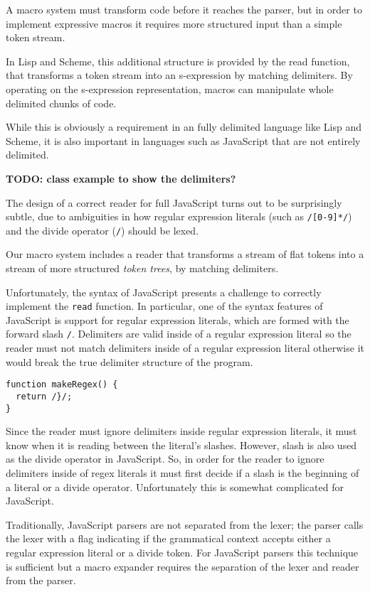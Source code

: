 \documentclass[preprint,10pt]{sigplanconf}
\begin{document}
A macro system must transform code before it reaches the parser, but
in order to implement expressive macros it requires more structured
input than a simple token stream.

In Lisp and Scheme, this additional structure is provided by the read
function, that transforms a token stream into an s-expression by
matching delimiters. By operating on the s-expression representation,
macros can manipulate whole delimited chunks of code.

While this is obviously a requirement in an fully delimited language
like Lisp and Scheme, it is also important in languages such as
JavaScript that are not entirely delimited.

\textbf{TODO: class example to show the delimiters?}

The design of a correct reader for full JavaScript turns out to be
surprisingly subtle, due to ambiguities in how regular expression
literals (such as \lstinline!/[0-9]*/!) and the divide operator
(\lstinline!/!) should be lexed.

Our macro system includes a reader that transforms a stream of flat
tokens into a stream of more structured \emph{token trees}, by
matching delimiters.

Unfortunately, the syntax of JavaScript presents a challenge to
correctly implement the \texttt{read} function. In particular, one of
the syntax features of JavaScript is support for regular expression
literals, which are formed with the forward slash \lstinline!/!.
Delimiters are valid inside of a regular expression literal so the
reader must not match delimiters inside of a regular expression
literal otherwise it would break the true delimiter structure of the
program.

\begin{lstlisting}
function makeRegex() {
  return /}/;
}
\end{lstlisting}

Since the reader must ignore delimiters inside regular expression
literals, it must know when it is reading between the literal's
slashes. However, slash is also used as the divide operator in
JavaScript. So, in order for the reader to ignore delimiters inside of
regex literals it must first decide if a slash is the beginning of a
literal or a divide operator. Unfortunately this is somewhat
complicated for JavaScript.

Traditionally, JavaScript parsers are not separated from the lexer;
the parser calls the lexer with a flag indicating if the grammatical
context accepts either a regular expression literal or a divide token.
For JavaScript parsers this technique is sufficient but a macro
expander requires the separation of the lexer and reader from the
parser.
\end{document}
